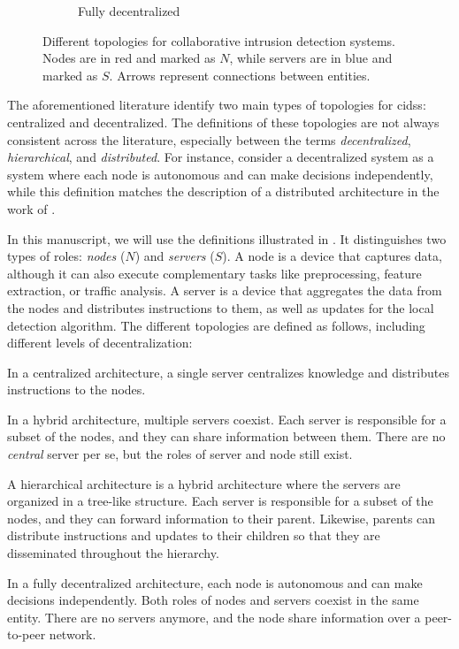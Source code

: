 \begin{figure}
\begin{subfigure}{.25\textwidth}
    \caption{Fully decentralized}
    \label{fig:cids.decentralized}
  \end{subfigure}
  \caption[
    Different topologies for collaborative intrusion detection systems.
  ]{
    Different topologies for collaborative intrusion detection systems.
    Nodes are in red and marked as $N$, while servers are in blue and marked as $S$.
    Arrows represent connections between entities.
    \label{fig:cids.topoligies}
  } 
\end{figure}

The aforementioned literature identify two main types of topologies for \glspl{cids}: centralized and decentralized. %
The definitions of these topologies are not always consistent across the literature, especially between the terms \emph{decentralized}, \emph{hierarchical}, and \emph{distributed}.
For instance, \textcite{zhou_surveycoordinatedattacks_2010} consider a decentralized system as a system where each node is autonomous and can make decisions independently, while this definition matches the description of a distributed architecture in the work of \textcite{li_SurveyingTrustBasedCollaborative_2022}.

In this manuscript, we will use the definitions illustrated in .
It distinguishes two types of roles: \emph{nodes} ($N$) and \emph{servers} ($S$).
A node is a device that captures data, although it can also execute complementary tasks like preprocessing, feature extraction, or traffic analysis.
A server is a device that aggregates the data from the nodes and distributes instructions to them, as well as updates for the local detection algorithm.
The different topologies are defined as follows, including different levels of decentralization:
\begin{description}[labelindent=1em]
  \item[Centralized.] In a centralized architecture, a single server centralizes knowledge and distributes instructions to the nodes.
  
  \item[Hybrid.] In a hybrid architecture, multiple servers coexist.
  Each server is responsible for a subset of the nodes, and they can share information between them.
  There are no \emph{central} server per se, but the roles of server and node still exist.
  
  \item[Hierarchical.] A hierarchical architecture is a hybrid architecture where the servers are organized in a tree-like structure.
  Each server is responsible for a subset of the nodes, and they can forward information to their parent.
  Likewise, parents can distribute instructions and updates to their children so that they are disseminated throughout the hierarchy.
  
  \item[Fully decentralized.] In a fully decentralized architecture, each node is autonomous and can make decisions independently.
  Both roles of nodes and servers coexist in the same entity.
  There are no servers anymore, and the node share information over a peer-to-peer network.
\end{description}

